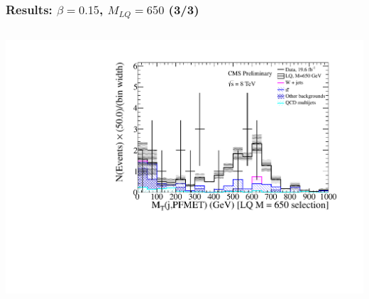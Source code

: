\documentclass[bigger]{beamer}
\begin{document}
\begin{frame}
\frametitle{Results: $\beta = 0.15$, $M_{LQ} = 650$ (3/3)}
\label{sec-5-4-3}
\begin{columns}
\begin{column}{0.6\textwidth}
\label{sec-5-4-3-1}

\centering
\mtjnu
\includegraphics[width=\textwidth]{fig/enu/finalSelection015/MTjnu_LQ650_enujj.pdf}
\end{column}
\end{columns}
\end{frame}
\end{document}
